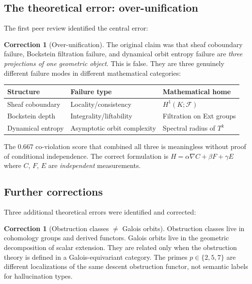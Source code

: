 \documentclass[11pt]{amsart}
\theoremstyle{definition}
\newtheorem{correction}[theorem]{Correction}
\begin{document}
\subsection{The theoretical error: over-unification}
\label{sec:over-unification}

The first peer review identified the central error:

\begin{correction}[Over-unification]
The original claim was that sheaf coboundary failure, Bockstein filtration
failure, and dynamical orbit entropy failure are \emph{three projections of
one geometric object}.
This is false.
They are three genuinely different failure modes in different mathematical categories:
\begin{center}
\begin{tabular}{lll}
\toprule
Structure & Failure type & Mathematical home \\
\midrule
Sheaf coboundary & Locality/consistency & $H^1(K;\mathcal{F})$ \\
Bockstein depth & Integrality/liftability & Filtration on Ext groups \\
Dynamical entropy & Asymptotic orbit complexity & Spectral radius of $T^k$ \\
\bottomrule
\end{tabular}
\end{center}
The $0.667$ co-violation score that combined all three is meaningless without
proof of conditional independence.
The correct formulation is $H = \alpha \nabla C + \beta F + \gamma E$
where $C$, $F$, $E$ are \emph{independent} measurements.
\end{correction}

\subsection{Further corrections}

Three additional theoretical errors were identified and corrected:

\begin{correction}[Obstruction classes $\neq$ Galois orbits]
Obstruction classes live in cohomology groups and derived functors.
Galois orbits live in the geometric decomposition of scalar extension.
They are related only when the obstruction theory is defined in a
Galois-equivariant category.
The primes $p \in \{2,5,7\}$ are different localizations of the same
descent obstruction functor, not semantic labels for hallucination types.
\end{correction}
\end{document}
